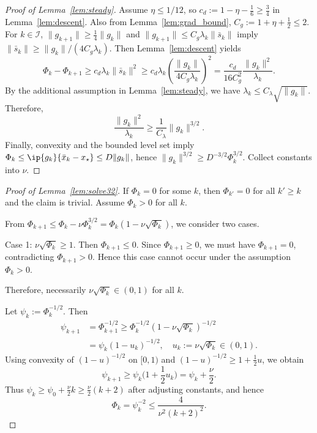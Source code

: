 \documentclass[review,onefignum,onetabnum]{siamart171218}
\begin{document}
	\begin{proof}[Proof of Lemma~\ref{lem:steady}]
		Assume $\eta\le 1/12$, so $c_d:=1-\eta-\frac16\ge \frac34$ in Lemma~\ref{lem:descent}.
		Also from Lemma~\ref{lem:grad_bound}, $C_g:=1+\eta+\frac12\le 2$.
		For $k\in\mathcal I$, $\|g_{k+1}\|\ge \frac14\|g_k\|$ and $\|g_{k+1}\|\le C_g\lambda_k\|\bar s_k\|$ imply
		$\|\bar s_k\|\ge \|g_k\|/(4C_g\lambda_k)$.
		Then Lemma~\ref{lem:descent} yields
		\[
		\Phi_k-\Phi_{k+1}\ge c_d\lambda_k\|\bar s_k\|^2
		\ge c_d\lambda_k\left(\frac{\|g_k\|}{4C_g\lambda_k}\right)^2
		=\frac{c_d}{16C_g^2}\frac{\|g_k\|^2}{\lambda_k}.
		\]
		By the additional assumption in Lemma~\ref{lem:steady}, we have $\lambda_k\le C_\lambda\sqrt{\|g_k\|}$.
		Therefore,
		\[
		\frac{\|g_k\|^2}{\lambda_k}\ge \frac{1}{C_\lambda}\|g_k\|^{3/2}.
		\]
		Finally, convexity and the bounded level set imply $\Phi_k\le \ip{g_k}{\bar x_k-x_\star}\le D\|g_k\|$, hence
		$\|g_k\|^{3/2}\ge D^{-3/2}\Phi_k^{3/2}$.
		Collect constants into $\nu$.
	\end{proof}
	
	\begin{proof}[Proof of Lemma~\ref{lem:solve32}]
		If $\Phi_k=0$ for some $k$, then $\Phi_{k'}=0$ for all $k'\ge k$ and the claim is trivial.
		Assume $\Phi_k>0$ for all $k$.
		
		From $\Phi_{k+1}\le \Phi_k-\nu \Phi_k^{3/2}=\Phi_k(1-\nu\sqrt{\Phi_k})$, we consider two cases.
		
		Case 1: $\nu\sqrt{\Phi_k}\ge 1$.
		Then $\Phi_{k+1}\le 0$. Since $\Phi_{k+1}\ge 0$, we must have $\Phi_{k+1}=0$,
		contradicting $\Phi_{k+1}>0$.
		Hence this case cannot occur under the assumption $\Phi_k>0$.
		
		Therefore, necessarily $\nu\sqrt{\Phi_k}\in(0,1)$ for all $k$.
		
		Let $\psi_k:=\Phi_k^{-1/2}$. Then
		\begin{align*}
			\psi_{k+1}&=\Phi_{k+1}^{-1/2}\ge \Phi_k^{-1/2}(1\!-\!\nu\sqrt{\Phi_k})^{-1/2}\\
			&=\psi_k(1\!-\!u_k)^{-1/2},\quad u_k:=\nu\sqrt{\Phi_k}\in(0,1).
		\end{align*}
		Using convexity of $(1-u)^{-1/2}$ on $[0,1)$ and $(1-u)^{-1/2}\ge 1+\frac12u$, we obtain
		\[
		\psi_{k+1}\ge \psi_k\Big(1+\frac12 u_k\Big)=\psi_k+\frac{\nu}{2}.
		\]
		Thus $\psi_k\ge \psi_0+\frac{\nu}{2}k\ge \frac{\nu}{2}(k+2)$ after adjusting constants, and hence
		\[
		\Phi_k=\psi_k^{-2}\le \frac{4}{\nu^2(k+2)^2}.
		\]
	\end{proof}
	
\end{document}
